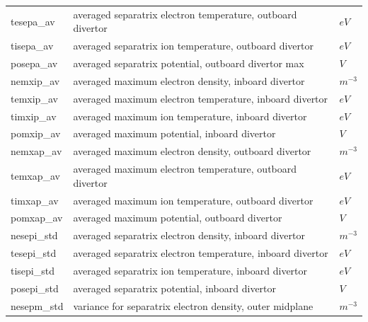 \documentclass[a4paper,10pt]{report}
\begin{document}
\begin{center}
\begin{longtable}{|l|l|l|}
tesepa\_av \index{tesepa\_av}\index{b2time.nc, tesepa\_av} & averaged separatrix electron temperature, outboard divertor & $eV$ \\
tisepa\_av \index{tisepa\_av}\index{b2time.nc, tisepa\_av} & averaged separatrix ion temperature, outboard divertor & $eV$ \\
posepa\_av \index{posepa\_av}\index{b2time.nc, posepa\_av} & averaged separatrix potential, outboard divertor max & $V $ \\
nemxip\_av \index{nemxip\_av}\index{b2time.nc, nemxip\_av} & averaged maximum electron density, inboard divertor & $m^{-3}$ \\
temxip\_av \index{temxip\_av}\index{b2time.nc, temxip\_av} & averaged maximum electron temperature, inboard divertor & $eV$ \\
timxip\_av \index{timxip\_av}\index{b2time.nc, timxip\_av} & averaged maximum ion temperature, inboard divertor & $eV$ \\
pomxip\_av \index{pomxip\_av}\index{b2time.nc, pomxip\_av} & averaged maximum potential, inboard divertor & $V $ \\
nemxap\_av \index{nemxap\_av}\index{b2time.nc, nemxap\_av} & averaged maximum electron density, outboard divertor & $m^{-3}$ \\
temxap\_av \index{temxap\_av}\index{b2time.nc, temxap\_av} & averaged maximum electron temperature, outboard divertor & $eV$ \\
timxap\_av \index{timxap\_av}\index{b2time.nc, timxap\_av} & averaged maximum ion temperature, outboard divertor  & $eV$ \\
pomxap\_av \index{pomxap\_av}\index{b2time.nc, pomxap\_av} & averaged maximum potential, outboard divertor & $V $ \\
nesepi\_std \index{nesepi\_std}\index{b2time.nc, nesepi\_std} & averaged separatrix electron density, inboard divertor & $m^{-3}$ \\
tesepi\_std \index{tesepi\_std}\index{b2time.nc, tesepi\_std} & averaged separatrix electron temperature, inboard divertor & $eV$ \\
tisepi\_std \index{tisepi\_std}\index{b2time.nc, tisepi\_std} & averaged separatrix ion temperature, inboard divertor & $eV$ \\
posepi\_std \index{posepi\_std}\index{b2time.nc, posepi\_std} & averaged separatrix potential, inboard divertor & $V $ \\
nesepm\_std \index{nesepm\_std}\index{b2time.nc, nesepm\_std} & variance for separatrix electron density, outer midplane & $m^{-3}$ \\

\end{longtable}
\end{center}
\end{document}
